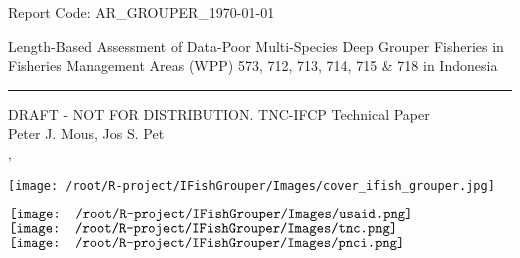 \begin{titlepage}
\begin{flushleft}
	\textsf{Report Code: AR\_GROUPER\_{\today}}
\end{flushleft}

\vspace*{2cm}
\begin{flushright}
        {\Large\textsf{Length-Based Assessment of Data-Poor Multi-Species Deep Grouper Fisheries in 
        \\[0.2cm] Fisheries Management Areas (WPP) 573, 712, 713, 714, 715 \& 718 in Indonesia}}\\[0.2cm]
        \rule{\linewidth}{0.5mm}
        \textsf{DRAFT - NOT FOR DISTRIBUTION. TNC-IFCP Technical Paper}\\[2cm]
        \textsf{Peter J. Mous, Jos S. Pet\\[1cm]
        {\MakeUppercase{\MONTH}} {\the\day}, {\the\year}}
\end{flushright}

\begin{center}
\texttt{[image: /root/R-project/IFishGrouper/Images/cover\_ifish\_grouper.jpg]}
\end{center}

\vfill

\noindent
\begin{minipage}[b]{\linewidth}
\noindent
\centering
$\vcenter{\hbox{\texttt{[image: /root/R-project/IFishGrouper/Images/usaid.png]}}}$
\hfill
$\vcenter{\hbox{\texttt{[image: /root/R-project/IFishGrouper/Images/tnc.png]}}}$
\hfill
$\vcenter{\hbox{\texttt{[image: /root/R-project/IFishGrouper/Images/pnci.png]}}}$
\end{minipage}
\end{titlepage}